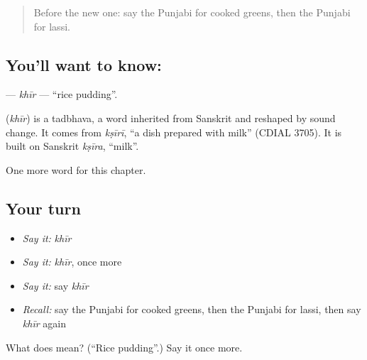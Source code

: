 \label{lesson:PA-C124-khir}



\begin{quote}
Before the new one: say the Punjabi for cooked greens, then the Punjabi for lassi.
\end{quote}

\subsection*{You'll want to know: }
\textbf{} — \emph{khīr} — \textquotedblleft{}rice pudding\textquotedblright{}.

\begin{cousinweb}
\textbf{} (\emph{khīr}) is a tadbhava, a word inherited from Sanskrit and reshaped by sound change. It comes from \emph{kṣīrī}, \textquotedblleft{}a dish prepared with milk\textquotedblright{} (CDIAL 3705). It is built on Sanskrit \emph{kṣīra}, \textquotedblleft{}milk\textquotedblright{}.
\end{cousinweb}

\begin{grammarlens}[title={What you've built}]
One more word for this chapter.
\end{grammarlens}

\subsection*{Your turn}
\begin{itemize}
\raggedright
  \item \emph{Say it:} \emph{khīr}
  \item \emph{Say it:} \emph{khīr}, once more
  \item \emph{Say it:} say \emph{khīr}
  \item \emph{Recall:} say the Punjabi for cooked greens, then the Punjabi for lassi, then say \emph{khīr} again
\end{itemize}

\begin{tcolorbox}[breakable,colback=teal!4,colframe=teal!35!black,title={Before you move on}]
What does  mean? (\textquotedblleft{}Rice pudding\textquotedblright{}.) Say it once more.
\end{tcolorbox}
